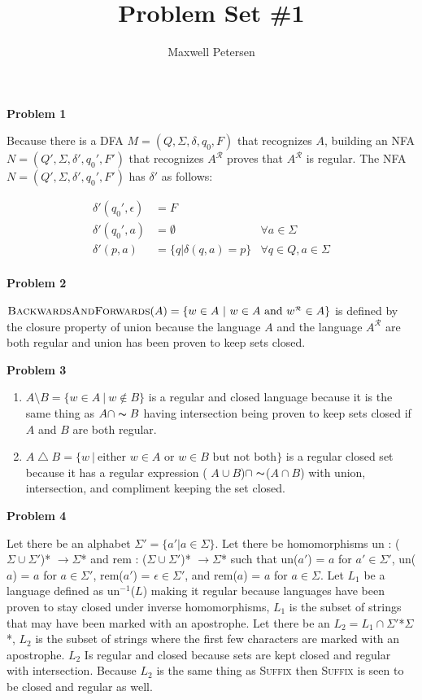 \documentclass[letterpaper,12pt]{article}
\title{Problem Set \#1}
\author{Maxwell Petersen}
\makeatletter
\newcommand{\rev}{^{\scriptscriptstyle\mathcal{R}}}
\newcommand*\langop{\textsc}
\let\oldsetminus\setminus
\renewcommand*\setminus{\mathbin\oldsetminus}
\newcommand\exercise[1]{\par\vspace{4ex}\normalfont\normalsize\noindent
\textbf{\large Problem #1}\par\nobreak\@afterindentfalse\@afterheading}
\makeatother
\begin{document}
\maketitle

\exercise{1}
Because there is a DFA $M=(Q,\Sigma,\delta,q_0,F)$ that recognizes $A$, building an NFA $N=(Q',\Sigma,\delta',q_0',F')$ that recognizes $A\rev$ proves that $A\rev$ is regular.
The NFA $N=(Q',\Sigma,\delta',q_0',F')$ has $\delta'$ as follows:

\begin{align*}
	\delta'(q_0',\epsilon) &= F\\
	\delta'(q_0',a) &= \emptyset & \forall a \in \Sigma\\
	\delta'(p,a) &= \{q|\delta(q,a) = p\} & \forall q \in Q, a \in \Sigma\\
\end{align*}

\exercise{2}
$\langop{BackwardsAndForwards}(A) = \{w\in A\ |\ \text{$w\in A$ and $w\rev\in A$}\}$ is defined by the closure property of union because the language $A$ and the language $A\rev$ are both regular and union has been proven to keep sets closed.

\exercise{3}
\begin{enumerate}
\item $A\setminus B=\{w\in A\ |\ w\notin B\}$  is a regular and closed language because it is the same thing as $A\cap \thicksim B$ having intersection being proven to keep sets closed if $A$ and $B$ are both regular.
\item $A\mathbin\triangle B=\{w\ |\ \text{either $w\in A$ or $w\in B$ but not both}\}$ is a regular closed set because it has a regular expression ( $A \cup B$)$ \cap \thicksim $($ A \cap B$) with union, intersection, and compliment keeping the set closed.
\end{enumerate}
\cleardoublepage

\exercise{4}
Let there be an alphabet $\Sigma' = \{a' | a \in \Sigma \}$. Let there be homomorphisms un : ($\Sigma \cup \Sigma'$)* $\rightarrow \Sigma$* and rem : ($\Sigma \cup \Sigma'$)* $\rightarrow \Sigma$* such that un($a'$) = $a$ for $a' \in \Sigma'$, un($a$) = $a$ for $a \in \Sigma'$, rem($a'$) = $\epsilon \in \Sigma'$, and rem($a$) = $a$ for $a \in \Sigma$. Let $L_1$ be a language defined as un$^{-1}$($L$) making it regular because languages have been proven to stay closed under inverse homomorphisms, $L_1$ is the subset of strings that may have been marked with an apostrophe. Let there be an $L_2 = L_1 \cap \Sigma'$*$\Sigma$*, $L_2$ is the subset of strings where the first few characters are marked with an apostrophe. $L_2$ Is regular and closed because sets are kept closed and regular with intersection. Because $L_2$ is the same thing as \langop{Suffix} then \langop{Suffix} is seen to be closed and regular as well.
\end{document}
